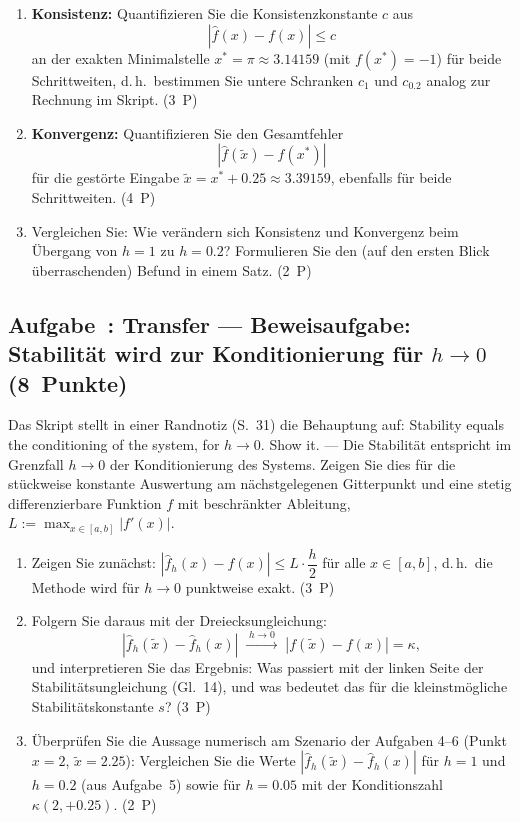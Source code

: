 \documentclass[a4paper,11pt]{scrartcl}
\newcounter{aufgabe}
\newcommand{\Aufgabe}[2]{%
  \refstepcounter{aufgabe}%
  \subsection*{Aufgabe~\theaufgabe: #1 \hfill (#2~Punkte)}%
  \label{auf:\theaufgabe}}
\begin{document}
\begin{enumerate}[label=(\alph*)]
  \item \textbf{Konsistenz:} Quantifizieren Sie die Konsistenzkonstante $c$ aus
  \[ \left| \hat{f}(x) - f(x) \right| \leq c \]
  an der exakten Minimalstelle $x^* = \pi \approx 3.14159$ (mit $f(x^*) = -1$) für beide Schrittweiten, d.\,h.\ bestimmen Sie untere Schranken $c_1$ und $c_{0.2}$ analog zur Rechnung im Skript. \hfill (3~P)
  \item \textbf{Konvergenz:} Quantifizieren Sie den Gesamtfehler
  \[ \left| \hat{f}(\tilde{x}) - f(x^*) \right| \]
  für die gestörte Eingabe $\tilde{x} = x^* + 0.25 \approx 3.39159$, ebenfalls für beide Schrittweiten. \hfill (4~P)
  \item Vergleichen Sie: Wie verändern sich Konsistenz und Konvergenz beim Übergang von $h = 1$ zu $h = 0.2$? Formulieren Sie den (auf den ersten Blick überraschenden) Befund in einem Satz. \hfill (2~P)
\end{enumerate}

\schreibraum[12]
\Aufgabe{Transfer --- Beweisaufgabe: Stabilität wird zur Konditionierung für $h \to 0$}{8}

Das Skript stellt in einer Randnotiz (S.~31) die Behauptung auf: \glqq Stability equals the conditioning of the system, for $h \to 0$. Show it.\grqq{} --- Die Stabilität entspricht im Grenzfall $h \to 0$ der Konditionierung des Systems. Zeigen Sie dies für die stückweise konstante Auswertung am nächstgelegenen Gitterpunkt und eine stetig differenzierbare Funktion $f$ mit beschränkter Ableitung, $L := \max_{x \in [a,b]} |f'(x)|$.

\begin{enumerate}[label=(\alph*)]
  \item Zeigen Sie zunächst: $\left| \hat{f}_h(x) - f(x) \right| \leq L \cdot \dfrac{h}{2}$ für alle $x \in [a,b]$, d.\,h.\ die Methode wird für $h \to 0$ punktweise exakt. \hfill (3~P)
  \item Folgern Sie daraus mit der Dreiecksungleichung:
  \[ \left| \hat{f}_h(\tilde{x}) - \hat{f}_h(x) \right| \;\xrightarrow{\;h \to 0\;}\; \left| f(\tilde{x}) - f(x) \right| = \kappa, \]
  und interpretieren Sie das Ergebnis: Was passiert mit der linken Seite der Stabilitätsungleichung (Gl.~14), und was bedeutet das für die kleinstmögliche Stabilitätskonstante $s$? \hfill (3~P)
  \item Überprüfen Sie die Aussage numerisch am Szenario der Aufgaben 4--6 (Punkt $x = 2$, $\tilde{x} = 2.25$): Vergleichen Sie die Werte $\left|\hat{f}_h(\tilde{x}) - \hat{f}_h(x)\right|$ für $h = 1$ und $h = 0.2$ (aus Aufgabe~5) sowie für $h = 0.05$ mit der Konditionszahl $\kappa(2, +0.25)$. \hfill (2~P)
\end{enumerate}
\end{document}
